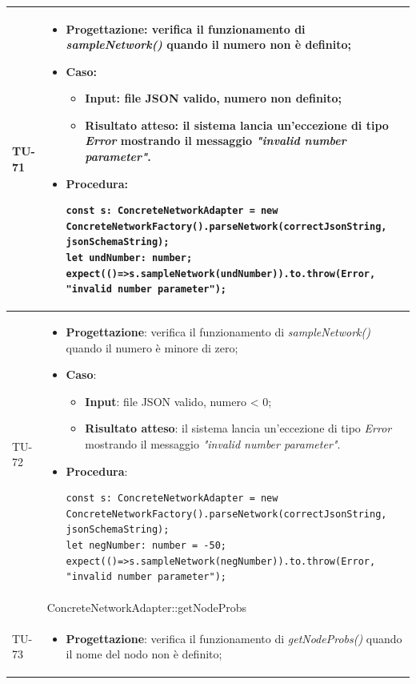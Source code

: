 \begin{longtable}{|C{1.5cm}|C{14.5cm}|}
{TU-71} &
\begin{itemize}
	\item \textbf{Progettazione}: verifica il funzionamento di \emph{sampleNetwork()} quando il numero non è definito;
	\item \textbf{Caso}: 
	\begin{itemize}
		\item \textbf{Input}: file JSON valido, numero non definito;
		\item \textbf{Risultato atteso}: il sistema lancia un'eccezione di tipo \emph{Error} mostrando il messaggio \emph{"invalid number parameter"}.
	\end{itemize}
	\item \textbf{Procedura}:
	\begin{lstlisting}
const s: ConcreteNetworkAdapter = new ConcreteNetworkFactory().parseNetwork(correctJsonString, jsonSchemaString);
let undNumber: number;
expect(()=>s.sampleNetwork(undNumber)).to.throw(Error, "invalid number parameter");
	\end{lstlisting}
\end{itemize}\\
\hline
{TU-72} &
\begin{itemize}
	\item \textbf{Progettazione}: verifica il funzionamento di \emph{sampleNetwork()} quando il numero è minore di zero;
	\item \textbf{Caso}: 
	\begin{itemize}
		\item \textbf{Input}: file JSON valido, numero < 0;
		\item \textbf{Risultato atteso}: il sistema lancia un'eccezione di tipo \emph{Error} mostrando il messaggio \emph{"invalid number parameter"}.
	\end{itemize}
	\item \textbf{Procedura}:
	\begin{lstlisting}
const s: ConcreteNetworkAdapter = new ConcreteNetworkFactory().parseNetwork(correctJsonString, jsonSchemaString);
let negNumber: number = -50;
expect(()=>s.sampleNetwork(negNumber)).to.throw(Error, "invalid number parameter");
	\end{lstlisting}
\end{itemize}\\
\hline
{} & ConcreteNetworkAdapter::getNodeProbs
\\ \hline
{TU-73} &
\begin{itemize}
	\item \textbf{Progettazione}: verifica il funzionamento di \emph{getNodeProbs()} quando il nome del nodo non è definito;

\end{itemize}
\end{longtable}
